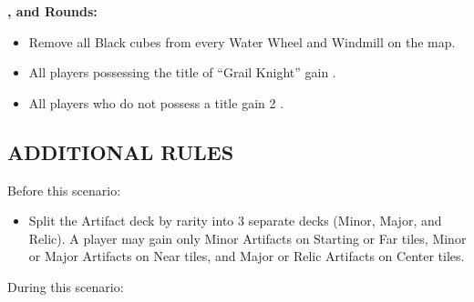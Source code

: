 \begin{multicols*}{2}
\textbf{,  and  Rounds:}
\begin{itemize}
  \item Remove all Black cubes from every Water Wheel and Windmill on the map.
  \item All players possessing the title of ``\textcolor{darkcerulean}{Grail Knight}'' gain .
  \item All players who do not possess a title gain 2 .
\end{itemize}

\subsection*{\MakeUppercase{Additional Rules}}
Before this scenario:

\begin{itemize}
  \item Split the Artifact deck by rarity into 3 separate decks (Minor, Major, and Relic). A player may gain only Minor Artifacts on Starting or Far tiles, Minor or Major Artifacts on Near tiles, and Major or Relic Artifacts on Center tiles.
\end{itemize}

During this scenario:


\end{multicols*}

